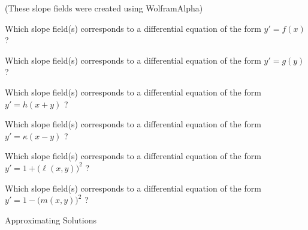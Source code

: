 \begin{notslides}
\hfill {\footnotesize(These slope fields were created using WolframAlpha)} \\	
\end{notslides}


\begin{parts}
	\item Which slope field(s) corresponds to a differential equation of the form
		\qquad $y'=f(x)$ \qquad ?	

	\item Which slope field(s) corresponds to a differential equation of the form
		\qquad $y'=g(y)$ \qquad ?	

	\item Which slope field(s) corresponds to a differential equation of the form
		\qquad $y'=h(x+y)$ \qquad ?	

	\item Which slope field(s) corresponds to a differential equation of the form
		\qquad $y'=\kappa(x-y)$ \qquad ?	

	\item Which slope field(s) corresponds to a differential equation of the form
		\qquad $y'=1+\big( \ell(x,y) \big)^2$ \qquad ?	

	\item Which slope field(s) corresponds to a differential equation of the form
		\qquad $y'=1-\big( m(x,y) \big)^2$ \qquad ?	

\end{parts}






\standardonlynewpage





%
%



\begin{module}{Approximating Solutions}
	\label{ODE:approximation}

	
	
\end{module}



